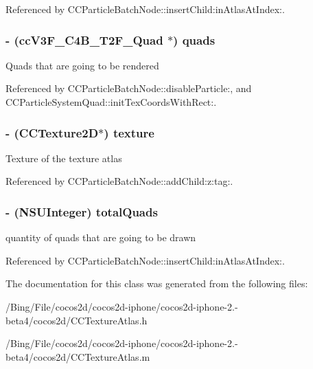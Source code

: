 Referenced by C\-C\-Particle\-Batch\-Node\-::insert\-Child\-:in\-Atlas\-At\-Index\-:.

\hypertarget{interface_c_c_texture_atlas_a7709f63e3948650e00aa884aaa445536}{
\subsubsection[{quads}]{\setlength{\rightskip}{0pt plus 5cm}-\/ ({\bf cc\-V3\-F\-\_\-\-C4\-B\-\_\-\-T2\-F\-\_\-\-Quad} $\ast$) {\bf quads}}}\label{interface_c_c_texture_atlas_a7709f63e3948650e00aa884aaa445536}
Quads that are going to be rendered 

Referenced by C\-C\-Particle\-Batch\-Node\-::disable\-Particle\-:, and C\-C\-Particle\-System\-Quad\-::init\-Tex\-Coords\-With\-Rect\-:.

\hypertarget{interface_c_c_texture_atlas_a2d6d32bd902b92d0d490bf334b44a043}{
\subsubsection[{texture}]{\setlength{\rightskip}{0pt plus 5cm}-\/ ({\bf C\-C\-Texture2\-D}$\ast$) {\bf texture}}}\label{interface_c_c_texture_atlas_a2d6d32bd902b92d0d490bf334b44a043}
Texture of the texture atlas 

Referenced by C\-C\-Particle\-Batch\-Node\-::add\-Child\-:z\-:tag\-:.

\hypertarget{interface_c_c_texture_atlas_a1fcff61e63514529e3d1c02b43503d9f}{
\subsubsection[{total\-Quads}]{\setlength{\rightskip}{0pt plus 5cm}-\/ (N\-S\-U\-Integer) {\bf total\-Quads}}}\label{interface_c_c_texture_atlas_a1fcff61e63514529e3d1c02b43503d9f}
quantity of quads that are going to be drawn 

Referenced by C\-C\-Particle\-Batch\-Node\-::insert\-Child\-:in\-Atlas\-At\-Index\-:.



The documentation for this class was generated from the following files\-:\begin{DoxyCompactItemize}
\item 
/\-Bing/\-File/cocos2d/cocos2d-\/iphone/cocos2d-\/iphone-\/2.-\/beta4/cocos2d/C\-C\-Texture\-Atlas.\-h\item 
/\-Bing/\-File/cocos2d/cocos2d-\/iphone/cocos2d-\/iphone-\/2.-\/beta4/cocos2d/C\-C\-Texture\-Atlas.\-m\end{DoxyCompactItemize}

